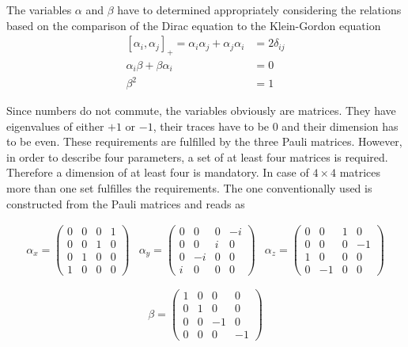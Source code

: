 The variables $\alpha$ and $\beta$ have to determined appropriately considering
the relations based on the comparison of the Dirac equation to the Klein-Gordon
equation
\begin{align}
\left[\alpha_i,\alpha_j\right]_+ = \alpha_i\alpha_j + \alpha_j\alpha_i
                                &= 2\delta_{ij}\\
  \alpha_i\beta + \beta\alpha_i &= 0 \\
  \beta^2                       &= 1
\end{align}

Since numbers do not commute, the variables obviously are matrices.
They have eigenvalues of either $+1$ or $-1$, their traces have to be 0
and their dimension has to be even. These requirements are fulfilled by the
three Pauli matrices. However, in order to describe four parameters, a set of
at least four matrices is required. Therefore a dimension of at least four is
mandatory. In case of $4\times 4$ matrices more than one set fulfilles the
requirements. The one conventionally used is constructed from the Pauli matrices
and reads as

\begin{equation}\begin{array}{lll}
\alpha_x= \left(\begin{array}{cccc}
0 & 0 & 0 & 1\\
0 & 0 & 1 & 0\\
0 & 1 & 0 & 0\\
1 & 0 & 0 & 0\end{array}\right)&
\alpha_y = \left(\begin{array}{cccc}
0 & 0 & 0 & -i\\
0 & 0 & i & 0\\
0 & -i& 0 & 0\\
i & 0 & 0 & 0\end{array}\right)&
\alpha_z = \left(\begin{array}{cccc}
0 & 0 & 1 & 0\\
0 & 0 & 0 &-1\\
1 & 0 & 0 & 0\\
0 & -1& 0 & 0
\end{array}\right)
\end{array}\end{equation}

\begin{equation}
\beta = \left(\begin{array}{cccc}
1 & 0 & 0 & 0\\
0 & 1 & 0 & 0\\
0 & 0 &-1 & 0\\
0 & 0 & 0 &-1
\end{array}\right)
\end{equation}


